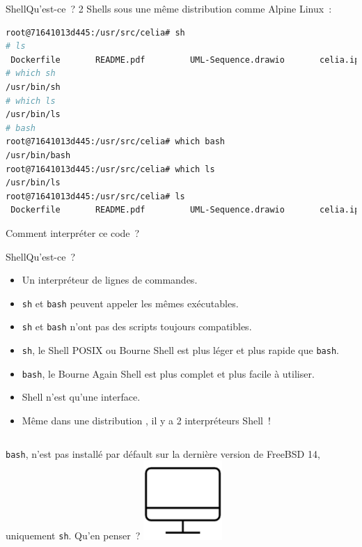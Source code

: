 \documentclass{beamer}
\begin{document}
    \begin{frame}[fragile]{Shell}{Qu'est-ce~?}
        2 Shells sous une même distribution  comme Alpine Linux~:
        \begin{lstlisting}[language=bash]
root@71641013d445:/usr/src/celia# sh
# ls
 Dockerfile       README.pdf         UML-Sequence.drawio       celia.ipynb
# which sh
/usr/bin/sh
# which ls
/usr/bin/ls
# bash
root@71641013d445:/usr/src/celia# which bash
/usr/bin/bash
root@71641013d445:/usr/src/celia# which ls
/usr/bin/ls
root@71641013d445:/usr/src/celia# ls
 Dockerfile       README.pdf         UML-Sequence.drawio       celia.ipynb
        \end{lstlisting}
        \bigbreak
        Comment interpréter ce code~?
    \end{frame}

    \begin{frame}{Shell}{Qu'est-ce~?}
        \begin{itemize}
            \item Un interpréteur de lignes de commandes.
            \item \lstinline{sh} et \lstinline{bash} peuvent appeler les mêmes exécutables.
            \item \lstinline{sh} et \lstinline{bash} n'ont pas des scripts toujours compatibles.
            \item \lstinline{sh}, le Shell POSIX ou Bourne Shell est plus léger et plus rapide que \lstinline{bash}.
            \item \lstinline{bash}, le Bourne Again Shell est plus complet et plus facile à utiliser.
            \item Shell n'est qu'une interface.
            \item Même dans une distribution , il y a 2 interpréteurs Shell~!
        \end{itemize}
        \begin{columns}
            \lstinline{bash}, n'est pas installé par défault sur la dernière version de FreeBSD 14, uniquement \lstinline{sh}.
            Qu'en penser~?
            \centering
            \includegraphics[width=3cm]{image/desktop}
        \end{columns}
    \end{frame}
\end{document}
